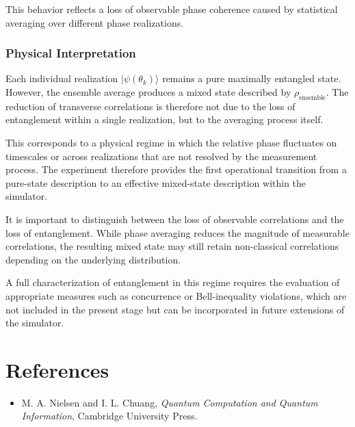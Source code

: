 \documentclass[a4paper]{article}
\begin{document}
This behavior reflects a loss of observable phase coherence caused by statistical averaging over different phase realizations.

\subsubsection{Physical Interpretation}

Each individual realization \( |\psi(\theta_k)\rangle \) remains a pure maximally entangled state. However, the ensemble average produces a mixed state described by \(\rho_{\mathrm{ensemble}}\). The reduction of transverse correlations is therefore not due to the loss of entanglement within a single realization, but to the averaging process itself.

This corresponds to a physical regime in which the relative phase fluctuates on timescales or across realizations that are not resolved by the measurement process. The experiment therefore provides the first operational transition from a pure-state description to an effective mixed-state description within the simulator.

It is important to distinguish between the loss of observable correlations and the loss of entanglement. While phase averaging reduces the magnitude of measurable correlations, the resulting mixed state may still retain non-classical correlations depending on the underlying distribution.

A full characterization of entanglement in this regime requires the evaluation of appropriate measures such as concurrence or Bell-inequality violations, which are not included in the present stage but can be incorporated in future extensions of the simulator.

\section{References}

\begin{itemize}
    \item M. A. Nielsen and I. L. Chuang, \textit{Quantum Computation and Quantum Information}, Cambridge University Press.
\end{itemize}
\end{document}
